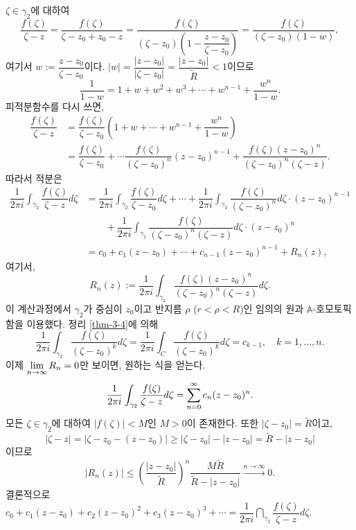 $\zeta \in \gamma_2$에 대하여
\[
\dfrac{f(\zeta)}{\zeta-z} = \dfrac{f(\zeta)}{\zeta-z_0+z_0-z}
= \dfrac{f(\zeta)}{(\zeta-z_0)\left(1 - \dfrac{z-z_0}{\zeta- z_0}\right)}
= \dfrac{f(\zeta)}{(\zeta-z_0)(1-w)},
\]
여기서 $w:= \dfrac{z-z_0}{\zeta- z_0}$이다.
$|w| = \dfrac{|z-z_0|}{|\zeta- z_0|} = \dfrac{|z-z_0|}{\tilde R} < 1$이므로
\[
\dfrac1{1-w} = 1+ w + w^2 + w^3 + \cdots + w^{n-1} + \dfrac{w^n}{1-w}.
\]
피적분함수를 다시 쓰면,
\begin{align*}
\dfrac{f(\zeta)}{\zeta-z} &= \dfrac{f(\zeta)}{\zeta-z_0} \left(
1+ w + \cdots + w^{n-1} + \dfrac{w^n}{1-w} \right) \\
&= \dfrac{f(\zeta)}{\zeta-z_0} + \cdots \dfrac{f(\zeta)}{(\zeta-z_0)^n}(z-z_0)^{n-1}
+ \dfrac{f(\zeta)(z-z_0)^n}{(\zeta-z_0)^n(\zeta-z)}.
\end{align*}
따라서 적분은
\begin{align*}
\dfrac1{2\pi i} \int_{\gamma_2} \dfrac{f(\zeta)}{\zeta-z} d\zeta
&= \dfrac1{2\pi i} \int_{\gamma_2} \dfrac{f(\zeta)}{\zeta-z_0} d\zeta
+ \cdots + \dfrac1{2\pi i} \int_{\gamma_2} \dfrac{f(\zeta)}{(\zeta-z_0)^n} d\zeta 
\cdot (z-z_0)^{n-1} \\
& \quad\quad + \dfrac1{2\pi i} \int_{\gamma_2} \dfrac{f(\zeta)}{(\zeta-z_0)^n(\zeta-z)} d\zeta
\cdot (z-z_0)^{n}  \\
&= c_0 + c_1(z-z_0) + \cdots + c_{n-1}(z-z_0)^{n-1} + R_n(z),
\end{align*}
여기서, 
\[
R_n(z) := \dfrac1{2\pi i} \int_{\gamma_2} \dfrac{f(\zeta)(z-z_0)^n}{(\zeta-z_0)^n(\zeta-z)} d\zeta.
\]
이 계산과정에서 $\gamma_2$가 중심이 $z_0$이고 반지름 $\rho$ ($r<\rho<R$)인
임의의 원과 $\mathbb A$-호모토픽함을 이용했다.
정리 \ref{thm-3-4}에 의해
\[
\dfrac1{2\pi i} \int_{\gamma_2} \dfrac{f(\zeta)}{(\zeta-z_0)^k} d\zeta
= \dfrac1{2\pi i} \int_{C} \dfrac{f(\zeta)}{(\zeta-z_0)^k} d\zeta
= c_{k-1},
\quad k=1,\ldots, n.
\]
이제 
$\lim\limits_{n\to\infty} R_n = 0$만 보이면,
원하는 식을 얻는다.
\[
\displaystyle\frac1{2\pi i} \displaystyle\int_{\gamma_2} \displaystyle\frac{f(\zeta)}{\zeta-z}d\zeta
= \sum\limits_{n=0}^\infty c_n(z-z_0)^n.
\]
모든 $\zeta \in \gamma_2$에 대하여 $|f(\zeta)| <M$인 $M>0$이 존재한다.
또한 $|\zeta - z_0| = \tilde R$이고,
\[
|\zeta - z| = |\zeta - z_0 - (z-z_0) | \ge
|\zeta - z_0| - |z-z_0| = \tilde R - |z-z_0|
\]
이므로 
\[
|R_n(z)| \le \left( \dfrac{|z-z_0|}{\tilde R} \right)^n
\dfrac{M\tilde R}{\tilde R - |z-z_0|} 
\stackrel{n\to\infty}{\longrightarrow} 0.
\]
결론적으로 
$c_0 + c_1(z-z_0) + c_2(z-z_0)^2 + c_3(z-z_0)^3 + \cdots
= \dfrac1{2\pi i } \dint_{\gamma_2} \dfrac{f(\zeta)}{\zeta-z}d\zeta$.


